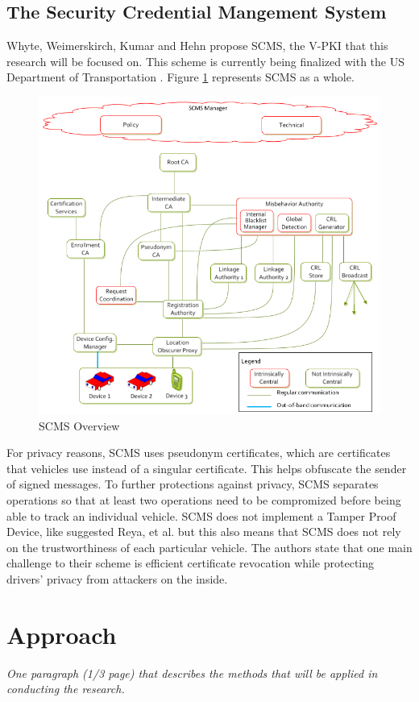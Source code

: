 \documentclass {article}
\newcommand{\sechint}[1]{\small{\emph{#1}} \bigskip}
\begin{document}
\subsection{The Security Credential Mangement System}
Whyte, Weimerskirch, Kumar and Hehn propose SCMS, the V-PKI that this research will be focused on. This scheme is currently being finalized with the US Department of Transportation \autocite{SecCredMgr}. Figure \ref{scms_overview} represents SCMS as a whole. 
\begin{figure}[!hb]
	\centering
	\includegraphics[width=.8\textwidth]{images/scms_overview.png}
	\caption{SCMS Overview}
	\label{scms_overview}
\end{figure}
For privacy reasons, SCMS uses pseudonym certificates, which are certificates that vehicles use instead of a singular certificate. This helps obfuscate the sender of signed messages. To further protections against privacy, SCMS separates operations so that at least two operations need to be compromized before being able to track an individual vehicle. SCMS does not implement a Tamper Proof Device, like suggested Reya, et al. but this also means that SCMS does not rely on the trustworthiness of each particular vehicle. The authors state that one main challenge to their scheme is efficient certificate revocation while protecting drivers' privacy from attackers on the inside.

\section{Approach}{\sechint{One paragraph (1/3 page) that describes the methods that will be applied in conducting the research.}}
\end{document}
